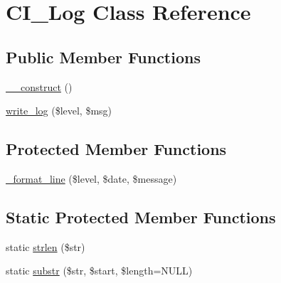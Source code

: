 \hypertarget{class_c_i___log}{}\section{C\+I\+\_\+\+Log Class Reference}
\label{class_c_i___log}
\subsection*{Public Member Functions}
\begin{DoxyCompactItemize}
\item 
\mbox{\hyperlink{class_c_i___log_a095c5d389db211932136b53f25f39685}{\+\_\+\+\_\+construct}} ()
\item 
\mbox{\hyperlink{class_c_i___log_ae63dcdf6d5a7f494d7e401e3fc6da2b4}{write\+\_\+log}} (\$level, \$msg)
\end{DoxyCompactItemize}
\subsection*{Protected Member Functions}
\begin{DoxyCompactItemize}
\item 
\mbox{\hyperlink{class_c_i___log_a437d13b6df516796c2b6ea1c4edc4e12}{\+\_\+format\+\_\+line}} (\$level, \$date, \$message)
\end{DoxyCompactItemize}
\subsection*{Static Protected Member Functions}
\begin{DoxyCompactItemize}
\item 
static \mbox{\hyperlink{class_c_i___log_a4c29a687d4ed62c26a10e41d98930d5f}{strlen}} (\$str)
\item 
static \mbox{\hyperlink{class_c_i___log_a101caef57ef0b165da5747e2c2e6c9dc}{substr}} (\$str, \$start, \$length=N\+U\+LL)
\end{DoxyCompactItemize}
